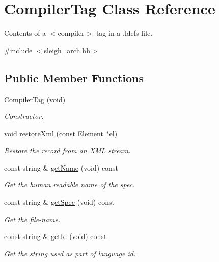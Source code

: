\hypertarget{class_compiler_tag}{}\section{Compiler\+Tag Class Reference}
\label{class_compiler_tag}


Contents of a $<$compiler$>$ tag in a .ldefs file.  




{\ttfamily \#include $<$sleigh\+\_\+arch.\+hh$>$}

\subsection*{Public Member Functions}
\begin{DoxyCompactItemize}
\item 
\mbox{\hyperlink{class_compiler_tag_a8c2c4eda8d631f5129289b0f90f99c52}{Compiler\+Tag}} (void)
\begin{DoxyCompactList}\small\item\em \mbox{\hyperlink{class_constructor}{Constructor}}. \end{DoxyCompactList}\item 
void \mbox{\hyperlink{class_compiler_tag_a6c2e63a701c04436828ffe665bbb054e}{restore\+Xml}} (const \mbox{\hyperlink{class_element}{Element}} $\ast$el)
\begin{DoxyCompactList}\small\item\em Restore the record from an X\+ML stream. \end{DoxyCompactList}\item 
const string \& \mbox{\hyperlink{class_compiler_tag_a6a6a45f36e7a1b2896f6a3a5e2cbc89a}{get\+Name}} (void) const
\begin{DoxyCompactList}\small\item\em Get the human readable name of the spec. \end{DoxyCompactList}\item 
const string \& \mbox{\hyperlink{class_compiler_tag_a35c6f109fb8f3545fc05cf842dea4348}{get\+Spec}} (void) const
\begin{DoxyCompactList}\small\item\em Get the file-\/name. \end{DoxyCompactList}\item 
const string \& \mbox{\hyperlink{class_compiler_tag_a70b72be387f600dc925eb5afa4f4efd6}{get\+Id}} (void) const
\begin{DoxyCompactList}\small\item\em Get the string used as part of {\itshape language} {\itshape id}. \end{DoxyCompactList}\end{DoxyCompactItemize}


